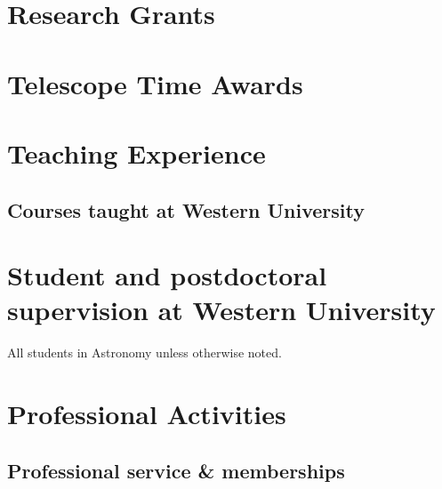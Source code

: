 \documentclass[12pt]{article}
\begin{document}
\section{Research Grants}



\section{Telescope Time Awards}


\section{Teaching Experience}

\subsection{Courses taught at Western University}


%

%

\vspace{0.8cm}

\section{Student and postdoctoral supervision at Western University}
All students in Astronomy unless otherwise noted.



\section{Professional Activities}


\subsection{Professional service \& memberships}

\end{document}

